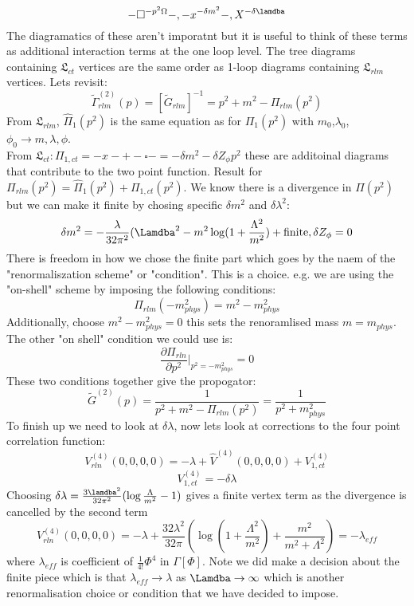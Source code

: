 \documentclass{article}
\begin{document}
$$
-\square^{-p^2 \Omega}-, -x^{-\delta m^2}-, X^{-\delta \lamdba}
$$
The diagramatics of these aren't imporatnt but it is useful to think of these terms as additional interaction terms at the one loop level. The tree diagrams containing $\mathfrak{L}_{ct}$ vertices are the same order as 1-loop diagrams containing $\mathfrak{L}_{rlm}$ vertices. Lets revisit:
$$
\tilde \Gamma_{rlm}^{(2)}(p) = [\tilde G_{rlm}]^{-1} = p^2 + m^2 - \Pi_{rlm}(p^2)
$$
From $\mathfrak{L}_{rlm}$, $\hat \Pi_1(p^2)$ is the same equation as for $\Pi_1(p^2)$ with $m_0$,$\lambda_0$, $\phi_0 \rightarrow m, \lambda, \phi$.\\
From $\mathfrak{L}_{ct}: \Pi_{1,ct} = -x- + -\square -= - \delta m^2 - \delta Z_{\phi} p^2$ these are additoinal diagrams that contribute to the two point function. Result for $\Pi_{rlm}(p^2) = \hat \Pi_1(p^2) + \Pi_{1,ct} (p^2)$. We know there is a divergence in $\hat \Pi(p^2)$ but we can make it finite by chosing specific $\delta m^2$ and $\delta \lambda^2$:
$$\delta m^2 = - \frac{\lambda}{32 \pi^2}( \Lamdba^2 - m^2 \log ( 1 + \frac{\Lambda^2}{m^2}) + \text{finite}, \delta Z_{\phi} = 0
$$
There is freedom in how we chose the finite part which goes by the naem of the "renormaliszation scheme" or "condition". This is a choice. e.g. we are using the "on-shell" scheme by imposing the following conditions:
$$
\Pi_{rlm}(- m^2_{phys}) = m^2 - m^2_{phys}
$$
Additionally, choose $m^2 - m^2_{phys} = 0$ this sets the renoramlised mass $m = m_{phys}$. The other "on shell" condition we could use is:
$$
\frac{\partial \Pi_{rln}}{\partial p^2}|_{p^2 = - m^2_{phys}} = 0
$$
These two conditions together give the propogator: 
$$
\tilde G^{(2)}(p) = \frac{1}{p^2 + m^2 - \Pi_{rlm}(p^2)} = \frac{1}{p^2 + m^2_{phys}}
$$
To finish up we need to look at $\delta \lambda$, now lets look at corrections to the four point correlation function:
$$
V^{(4)}_{rln}(0,0,0,0) = - \lambda + \hat V^{(4)}(0,0,0,0) + V_{1,ct}^{(4)}
$$
$$
V_{1,ct}^{(4)} = - \delta \lambda
$$
Choosing $\delta \lambda = \frac{3 \lamdba^2}{32 \pi^2} ( \log \frac{\Lambda}{m^2} - 1)$
gives a finite vertex term as the divergence is cancelled by the second term
$$
V_{rln}^{(4)}(0,0,0,0) = - \lambda + \frac{32 \lambda^2}{32 \pi} ( \log ( 1+ \frac{\Lambda^2}{m^2}) + \frac{m^2}{m^2 + \Lambda^2}) = - \lambda_{eff}
$$
where $\lambda_{eff}$ is coefficient of $\frac{1}{4!}\Phi^4$  in $\Gamma[\Phi]$. Note we did make a decision about the finite piece which is that $\lambda_{eff} \rightarrow \lambda$ as $\Lamdba \rightarrow \infty$ which is another renormalisation choice or condition that we have decided to impose.
\end{document}
